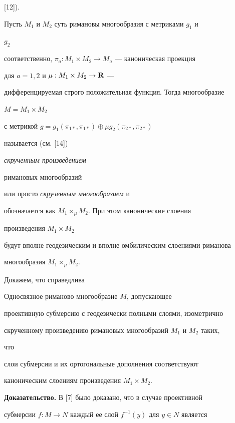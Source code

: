 [12]). 


 


Пусть $M_1$ и $M_2$ суть римановы многообразия с метриками $g_1$ и 


$g_2$ 


соответственно, $\pi_a:M_1\times M_2\to M_a$ --- каноническая проекция 


для $a=1,2$ и $\mu:M_1\times M_2\to\bold R$ --- 


дифференцируемая строго положительная функция. Тогда многообразие 


$M=M_1\times M_2$ 


с метрикой $g=g_1(\pi_{1*},\pi_{1*})\oplus\mu g_2(\pi_{2*},\pi_{2*})$ 


называется (см. [14]) {\it скрученным произведением 


римановых многообразий} или просто {\it скрученным многообразием} и 


обозначается как $M_1\times_\mu M_2$. При этом канонические слоения 


произведения $M_1\times M_2$ 


будут вполне геодезическим и вполне омбилическим слоениями риманова 


многообразия $M_1\times_\mu M_2$. 


 


Докажем, что справедлива 


 


\begin{thm} Односвязное риманово многообразие $M$, допускающее 


проективную субмерсию с геодезически полными слоями, изометрично 


скрученному произведению римановых многообразий $M_1$ и $M_2$ таких, 


что 


слои субмерсии и их ортогональные дополнения соответствуют 


каноническим слоениям произведения $M_1\times M_2$. 


\end{thm} 


 


{\bf Доказательство.} В [7] было доказано, что в случае проективной 


субмерсии $f:M\to N$ каждый ее слой $f^{-1}(y)$ для $y\in N$ является 


